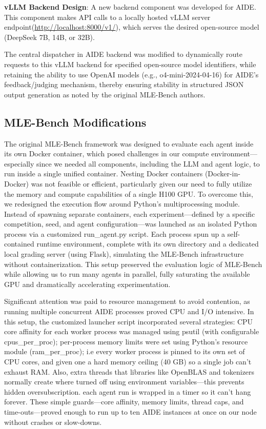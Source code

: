 \textbf{vLLM Backend Design}: A new backend component was developed for AIDE. This component makes API calls to a locally hosted vLLM server endpoint(\url{http://localhost:8000/v1/}), which serves the desired open-source model (DeepSeek 7B, 14B, or 32B).

The central dispatcher in AIDE backend was modified to dynamically route requests to this vLLM backend for specified open-source model identifiers, while retaining the ability to use OpenAI models (e.g., o4-mini-2024-04-16) for AIDE's feedback/judging mechanism, thereby ensuring stability in structured JSON output generation as noted by the original MLE-Bench authors.

\subsection{MLE-Bench Modifications}

The original MLE-Bench framework was designed to evaluate each agent inside its own Docker container, which posed challenges in our compute environment—especially since we needed all components, including the LLM and agent logic, to run inside a single unified container. Nesting Docker containers (Docker-in-Docker) was not feasible or efficient, particularly given our need to fully utilize the memory and compute capabilities of a single H100 GPU. To overcome this, we redesigned the execution flow around Python's multiprocessing module. Instead of spawning separate containers, each experiment—defined by a specific competition, seed, and agent configuration—was launched as an isolated Python process via a customized run\_agent.py script.
Each process spun up a self-contained runtime environment, complete with its own directory and a dedicated local grading server (using Flask), simulating the MLE-Bench infrastructure without containerization. This setup preserved the evaluation logic of MLE-Bench while allowing us to run many agents in parallel, fully saturating the available GPU and dramatically accelerating experimentation.

Significant attention was paid to resource management to avoid contention, as running multiple concurrent AIDE processes proved CPU and I/O intensive. In this setup, the customized launcher script incorporated several strategies: CPU core affinity for each worker process was managed using psutil (with configurable cpus\_per\_proc); per-process memory limits were set using Python's resource module (ram\_per\_proc); i.e every worker process is pinned to its own set of CPU cores, and given one a hard memory ceiling (40 GB) so a single job can’t exhaust RAM. Also, extra threads that libraries like OpenBLAS and tokenizers normally create where turned off using environment variables—this prevents hidden oversubscription. each agent run is wrapped in a timer so it can’t hang forever. These simple guards—core affinity, memory limits, thread caps, and time-outs—proved enough to run up to ten AIDE instances at once on our node without crashes or slow-downs.


